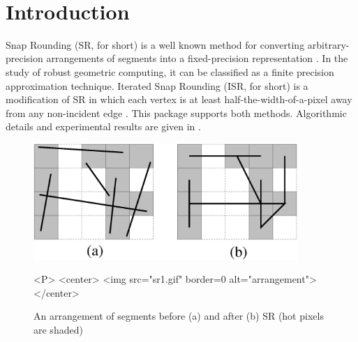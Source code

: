 
\ccParDims


\\
\newcommand{\reals}{{\rm I\!\hspace{-0.025em} R}}
\def\A{{\cal A}}
\def\S{{\cal S}}

\section{Introduction}
Snap Rounding (SR, for short) is a well known method for converting
arbitrary-precision arrangements of segments into a fixed-precision
representation \cite{gght-srlse-97, gm-rad-98, h-psifp-99}. In
the study of robust geometric computing, it can be classified
as a finite precision approximation technique. Iterated Snap Rounding
(ISR, for short) is a modification of SR in which each vertex is at least
half-the-width-of-a-pixel away from any non-incident edge
\cite{cgal:hp-isr-02}. This package supports both methods. Algorithmic
details and experimental results are given in \cite{cgal:hp-isr-02}.

\begin{figure}
\begin{ccTexOnly}
\centerline{\includegraphics[width=10cm]{Snap_rounding_2/sr1.ps}}
\end{ccTexOnly}

\caption{An arrangement of segments before (a) and after (b)
SR (hot pixels are shaded)}
\label{fig:sr1}

\begin{ccHtmlOnly}
<P>
<center>
  <img src="sr1.gif"  border=0 alt="arrangement">
</center>
\end{ccHtmlOnly}
\end{figure}

